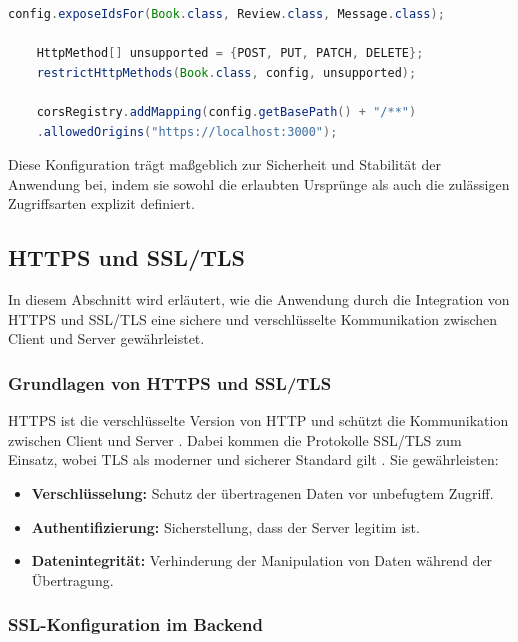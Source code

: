 \begin{lstlisting}[language=Java, caption={CORS und HTTP-Methodenbeschränkung}]
	config.exposeIdsFor(Book.class, Review.class, Message.class);
	
	HttpMethod[] unsupported = {POST, PUT, PATCH, DELETE};
	restrictHttpMethods(Book.class, config, unsupported);
	
	corsRegistry.addMapping(config.getBasePath() + "/**")
	.allowedOrigins("https://localhost:3000");
\end{lstlisting}
Diese Konfiguration trägt maßgeblich zur Sicherheit und Stabilität der Anwendung bei, indem sie sowohl die erlaubten Ursprünge als auch die zulässigen Zugriffsarten explizit definiert.

\subsection{HTTPS und SSL/TLS}
In diesem Abschnitt wird erläutert, wie die Anwendung durch die Integration von HTTPS und SSL/TLS eine sichere und verschlüsselte Kommunikation zwischen Client und Server gewährleistet.

\subsubsection{Grundlagen von HTTPS und SSL/TLS}

HTTPS ist die verschlüsselte Version von HTTP und schützt die Kommunikation zwischen Client und Server \cite{HTTPS:2024}. Dabei kommen die Protokolle SSL/TLS zum Einsatz, wobei TLS als moderner und sicherer Standard gilt \cite{SSL/TLS:2023}. Sie gewährleisten:

\begin{itemize}
	\item \textbf{Verschlüsselung:} Schutz der übertragenen Daten vor unbefugtem Zugriff.
	\item \textbf{Authentifizierung:} Sicherstellung, dass der Server legitim ist.
	\item \textbf{Datenintegrität:} Verhinderung der Manipulation von Daten während der Übertragung.
\end{itemize}

\subsubsection{SSL-Konfiguration im Backend}

